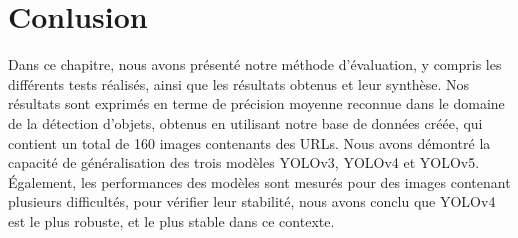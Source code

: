 \section{Conlusion}

Dans ce chapitre, nous avons présenté notre méthode d'évaluation, y compris les différents tests réalisés, ainsi que les résultats obtenus et leur synthèse. Nos résultats sont exprimés en terme de précision moyenne reconnue  dans le domaine de la détection d'objets, obtenus en utilisant notre base de données créée, qui contient un total de 160 images contenants des URLs.  Nous avons démontré la capacité de généralisation des trois   modèles YOLOv3, YOLOv4 et YOLOv5.
Également, les performances des modèles sont mesurés pour des images contenant plusieurs difficultés, pour vérifier leur stabilité,  nous avons conclu que YOLOv4 est le plus robuste, et le plus stable dans ce contexte.


